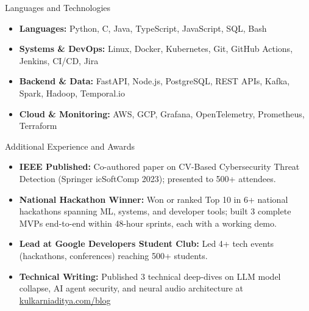 \documentclass[]{mcdowellcv}
\begin{document}
\begin{cvsection}{Languages and Technologies}
  \begin{cvsubsection}{}{}{}
    \begin{itemize}
      \item \textbf{Languages:} Python, C, Java, TypeScript, JavaScript, SQL, Bash
      \item \textbf{Systems \& DevOps:} Linux, Docker, Kubernetes, Git, GitHub Actions, Jenkins, CI/CD, Jira
      \item \textbf{Backend \& Data:} FastAPI, Node.js, PostgreSQL, REST APIs, Kafka, Spark, Hadoop, Temporal.io
      \item \textbf{Cloud \& Monitoring:} AWS, GCP, Grafana, OpenTelemetry, Prometheus, Terraform
    \end{itemize}
  \end{cvsubsection}
\end{cvsection}

\begin{cvsection}{Additional Experience and Awards}
  \begin{cvsubsection}{}{}{}
    \begin{itemize}
      \item \textbf{IEEE Published:} Co-authored paper on CV-Based Cybersecurity Threat Detection (Springer icSoftComp 2023); presented to 500+ attendees.
      \item \textbf{National Hackathon Winner:} Won or ranked Top 10 in 6+ national hackathons spanning ML, systems, and developer tools; built 3 complete MVPs end-to-end within 48-hour sprints, each with a working demo.
      \item \textbf{Lead at Google Developers Student Club:} Led 4+ tech events (hackathons, conferences) reaching 500+ students.
      \item \textbf{Technical Writing:} Published 3 technical deep-dives on LLM model collapse, AI agent security, and neural audio architecture at \href{https://www.kulkarniaditya.com/blog}{kulkarniaditya.com/blog}
    \end{itemize}
  \end{cvsubsection}
\end{cvsection}
\end{document}
